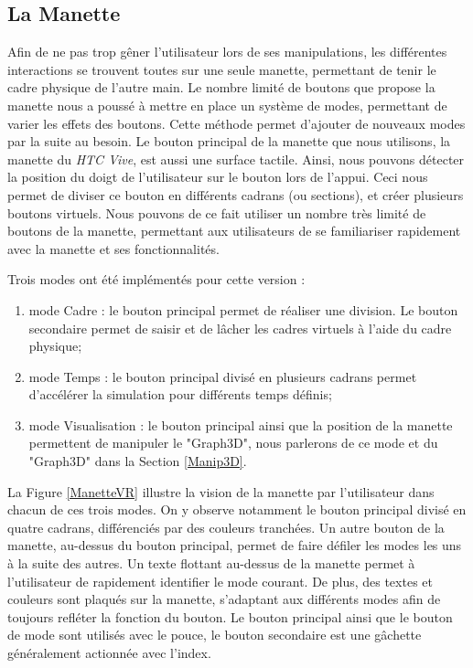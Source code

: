 		\subsection{La Manette}		
		Afin de ne pas trop gêner l'utilisateur lors de ses manipulations, les différentes interactions se trouvent toutes sur une seule manette, permettant de tenir le cadre physique de l'autre main. Le nombre limité de boutons que propose la manette nous a poussé à mettre en place un système de modes, permettant de varier les effets des boutons. Cette méthode permet d'ajouter de nouveaux modes par la suite au besoin. 		
		Le bouton principal de la manette que nous utilisons, la manette du \textit{HTC Vive}, est aussi une surface tactile. Ainsi, nous pouvons détecter la position du doigt de l'utilisateur sur le bouton lors de l'appui. Ceci nous permet de diviser ce bouton en différents cadrans (ou sections), et créer plusieurs boutons virtuels. Nous pouvons de ce fait utiliser un nombre très limité de boutons de la manette, permettant aux utilisateurs de se familiariser rapidement avec la manette et ses fonctionnalités. 
		
		Trois modes ont été implémentés pour cette version :		
		\begin{enumerate}
			\item mode Cadre : le bouton principal permet de réaliser une division. Le bouton secondaire permet de saisir et de lâcher les cadres virtuels à l'aide du cadre physique;
			\item mode Temps : le bouton principal divisé en plusieurs cadrans permet d'accélérer la simulation pour différents temps définis;
			\item mode Visualisation : le bouton principal ainsi que la position de la manette permettent de manipuler le "Graph3D", nous parlerons de ce mode et du "Graph3D" dans la Section \ref{Manip3D}.
		\end{enumerate}
		
		La Figure \ref{ManetteVR} illustre la vision de la manette par l'utilisateur dans chacun de ces trois modes. On y observe notamment le bouton principal divisé en quatre cadrans, différenciés par des couleurs tranchées. Un autre bouton de la manette, au-dessus du bouton principal, permet de faire défiler les modes les uns à la suite des autres. Un texte flottant au-dessus de la manette permet à l'utilisateur de rapidement identifier le mode courant. De plus, des textes et couleurs sont plaqués sur la manette, s'adaptant aux différents modes afin de toujours refléter la fonction du bouton. Le bouton principal ainsi que le bouton de mode sont utilisés avec le pouce, le bouton secondaire est une gâchette généralement actionnée avec l'index.
		
